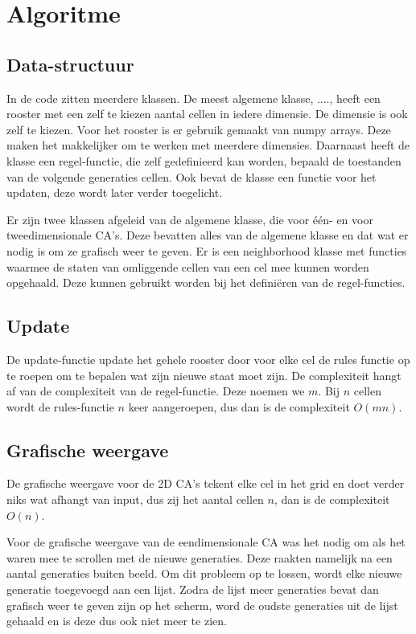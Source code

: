 \documentclass{article}
\begin{document}
\section{Algoritme}


\subsection{Data-structuur} %
In de code zitten meerdere klassen. De meest algemene klasse, ...., heeft een rooster met een zelf te kiezen aantal cellen in iedere dimensie. De dimensie is ook zelf te kiezen. Voor het rooster is er gebruik gemaakt van numpy arrays. Deze maken het makkelijker om te werken met meerdere dimensies. \newline
Daarnaast heeft de klasse een regel-functie, die zelf gedefinieerd kan worden, bepaald de toestanden van de volgende generaties cellen. \newline Ook bevat de klasse een functie voor het updaten, deze wordt later verder toegelicht.

Er zijn twee klassen afgeleid van de algemene klasse, die voor één- en voor tweedimensionale CA's. Deze bevatten alles van de algemene klasse en dat wat er nodig is om ze grafisch weer te geven. Er is een neighborhood klasse met functies waarmee de staten van omliggende cellen van een cel mee kunnen worden opgehaald. Deze kunnen gebruikt worden bij het definiëren van de regel-functies. 

\subsection{Update}
De update-functie update het gehele rooster door voor elke cel de rules functie op te roepen om te bepalen wat zijn nieuwe staat moet zijn. De complexiteit hangt af van de complexiteit van de regel-functie. Deze noemen we $m$. Bij $n$ cellen wordt de rules-functie $n$ keer aangeroepen, dus dan is de complexiteit $O(mn)$.

\subsection{Grafische weergave}
De grafische weergave voor de 2D CA's tekent elke cel in het grid en doet verder niks wat afhangt van input, dus zij het aantal cellen $n$, dan is de complexiteit $O(n)$.

Voor de grafische weergave van de eendimensionale CA was het nodig om als het waren mee te scrollen met de nieuwe generaties. Deze raakten namelijk na een aantal generaties buiten beeld. Om dit probleem op te lossen, wordt elke nieuwe generatie toegevoegd aan een lijst. Zodra de lijst meer generaties bevat dan grafisch weer te geven zijn op het scherm, word de oudste generaties uit de lijst gehaald en is deze dus ook niet meer te zien.
\end{document}
